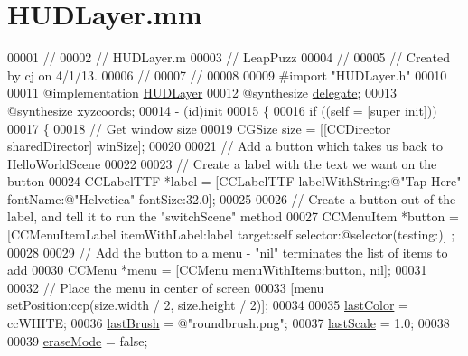 \hypertarget{_h_u_d_layer_8mm}{\section{H\-U\-D\-Layer.\-mm}
\label{d2/d44/_h_u_d_layer_8mm}
}

\begin{DoxyCode}
00001 \textcolor{comment}{//}
00002 \textcolor{comment}{//  HUDLayer.m}
00003 \textcolor{comment}{//  LeapPuzz}
00004 \textcolor{comment}{//}
00005 \textcolor{comment}{//  Created by cj on 4/1/13.}
00006 \textcolor{comment}{//}
00007 \textcolor{comment}{//}
00008 
00009 \textcolor{preprocessor}{#import "HUDLayer.h"}
00010 
00011 \textcolor{keyword}{@implementation }\hyperlink{interface_h_u_d_layer}{HUDLayer}
00012 \textcolor{keyword}{@synthesize} \hyperlink{interface_h_u_d_layer_a64cb26c1f8c5a76e8f392a02291c0cf6}{delegate};
00013 \textcolor{keyword}{@synthesize} xyzcoords;
00014 - (id)init
00015 \{
00016     \textcolor{keywordflow}{if} ((\textcolor{keyword}{self} = [super init]))
00017     \{
00018         \textcolor{comment}{// Get window size}
00019         CGSize size = [[CCDirector sharedDirector] winSize];
00020         
00021         \textcolor{comment}{// Add a button which takes us back to HelloWorldScene}
00022         
00023         \textcolor{comment}{// Create a label with the text we want on the button}
00024         CCLabelTTF *label = [CCLabelTTF labelWithString:@"Tap Here" fontName:@"Helvetica" fontSize:32.0];
00025         
00026         \textcolor{comment}{// Create a button out of the label, and tell it to run the "switchScene" method}
00027         CCMenuItem *button = [CCMenuItemLabel itemWithLabel:label target:self selector:@selector(testing:)]
      ;
00028         
00029         \textcolor{comment}{// Add the button to a menu - "nil" terminates the list of items to add}
00030         CCMenu *menu = [CCMenu menuWithItems:button, nil];
00031         
00032         \textcolor{comment}{// Place the menu in center of screen}
00033         [menu setPosition:ccp(size.width / 2, size.height / 2)];
00034         
00035         \hyperlink{interface_h_u_d_layer_a2d27bf64876ea6f0b2f0d1b9013c1cd7}{lastColor} = ccWHITE;
00036         \hyperlink{interface_h_u_d_layer_ad7cb8a30419241ee8d2f2813031191be}{lastBrush} = \textcolor{stringliteral}{@"roundbrush.png"};
00037         \hyperlink{interface_h_u_d_layer_aedd1d8d2b2d31e203c3242d09390b561}{lastScale} = 1.0;
00038         
00039         \hyperlink{interface_h_u_d_layer_aa1df984387a5f884acf38a7d733d6432}{eraseMode} = \textcolor{keyword}{false};

\end{DoxyCode}
